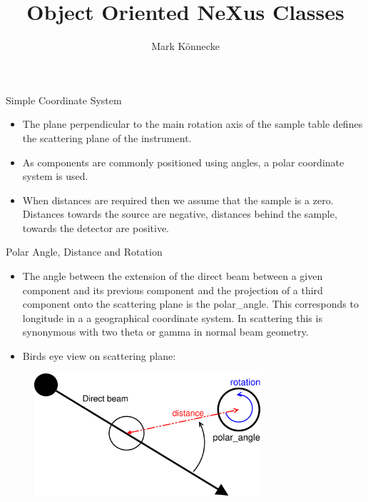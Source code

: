 \documentclass[final,nototal,pdf,mark]{prosper}
\title{Object Oriented NeXus Classes }
\author{Mark K\"onnecke}
\begin{document}
\maketitle



\begin{slide}{Simple Coordinate System }
\begin{itemize}\item The plane perpendicular to the main rotation axis of the sample table def\mbox{}ines the 
 scattering plane of the instrument.  
\item As components are commonly positioned using angles, a polar coordinate system is used.
\item When distances are required then we assume that the sample is a zero. Distances towards the
 source are negative, distances behind the sample, towards the detector are positive.  
\end{itemize}
\end{slide}\begin{slide}{Polar Angle, Distance and Rotation }
\begin{itemize}\item The angle between the extension of the direct beam between a given component and its previous 
 component  and the projection of a third component onto the scattering plane is the polar\_angle. This 
 corresponds to longitude in a a geographical coordinate system. In scattering this is synonymous with 
 two theta or gamma in normal beam geometry.
\item Birds eye view on scattering plane:
\end{itemize}\begin{center}
\begin{figure}
\includegraphics[width=0.75\textwidth]{polar.eps}\end{figure}



\end{center}


\end{slide}
\end{document}
